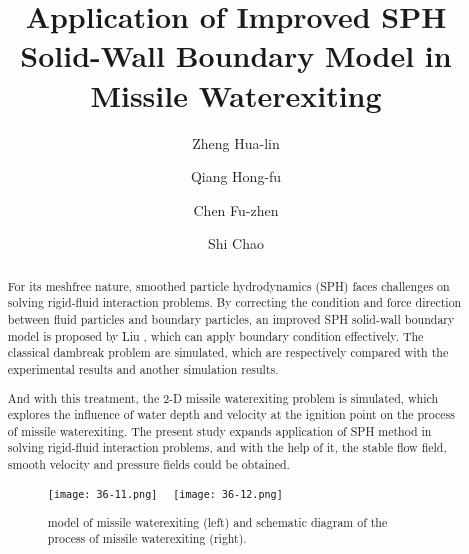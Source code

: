 \documentclass[10pt]{article}
\title{Application of Improved SPH Solid-Wall Boundary Model in Missile Waterexiting}
\date{}
\author[$\relax$]{Zheng Hua-lin}
\author[$\relax$]{Qiang Hong-fu}
\author[$\relax$]{Chen Fu-zhen}
\author[$\relax$]{Shi Chao}
\affil[$\relax$]{Department of Power Engineering, Xi'an Hi-Tech Institute, China}
\affil[$\relax$]{\email{}{zero2one@aliyun.com}}
\begin{document}
\maketitle


\begin{abstract}
For its meshfree nature, smoothed particle hydrodynamics (SPH) faces challenges on solving rigid-fluid interaction problems. By correcting the condition and force direction between fluid particles and boundary particles, an improved SPH solid-wall boundary model is proposed by Liu \cite{hu2015new}, which can apply boundary condition effectively. The classical dambreak problem are simulated, which are respectively compared with the experimental results and another simulation results.

And with this treatment, the 2-D missile waterexiting problem is simulated, which explores the influence of water depth and velocity at the ignition point on the process of missile waterexiting. The present study expands application of SPH method in solving rigid-fluid interaction problems, and with the help of it, the stable flow field, smooth velocity and pressure fields could be obtained.

\begin{figure}[!htb]
\centering
\texttt{[image: 36-11.png]}~~
\texttt{[image: 36-12.png]}
\caption{model of missile waterexiting (left) and schematic diagram of the process of missile waterexiting (right).}\label{fig:36}
\end{figure}

\end{abstract}



\addbib
\end{document}
